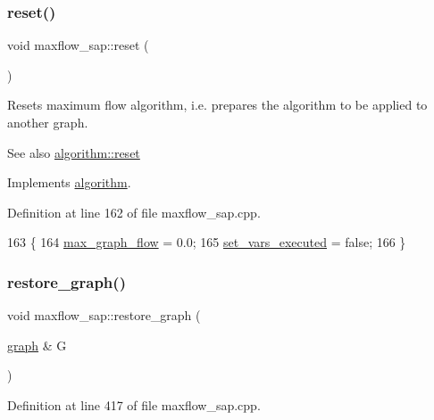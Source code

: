 \subsubsection{\texorpdfstring{reset()}{reset()}}
{\footnotesize\ttfamily void maxflow\+\_\+sap\+::reset (\begin{DoxyParamCaption}{ }\end{DoxyParamCaption})\hspace{0.3cm}{\ttfamily [virtual]}}

Resets maximum flow algorithm, i.\+e. prepares the algorithm to be applied to another graph.

\begin{DoxySeeAlso}{See also}
\mbox{\hyperlink{classalgorithm_a21aba63d066ae7897de6ca7d8425c408}{algorithm\+::reset}} 
\end{DoxySeeAlso}


Implements \mbox{\hyperlink{classalgorithm_a21aba63d066ae7897de6ca7d8425c408}{algorithm}}.



Definition at line 162 of file maxflow\+\_\+sap.\+cpp.


\begin{DoxyCode}
163 \{
164     \mbox{\hyperlink{classmaxflow__sap_a77c650fd11632352a1228f2cbd38caf1}{max\_graph\_flow}} = 0.0;
165     \mbox{\hyperlink{classmaxflow__sap_aad7f764b9e9732b996f402ffadbf5b70}{set\_vars\_executed}} = \textcolor{keyword}{false};
166 \}
\end{DoxyCode}
\mbox{\label{classmaxflow__sap_ad1a311df47e4b9936ead7c306d723ed0}} 
\subsubsection{\texorpdfstring{restore\+\_\+graph()}{restore\_graph()}}
{\footnotesize\ttfamily void maxflow\+\_\+sap\+::restore\+\_\+graph (\begin{DoxyParamCaption}\item[{\mbox{\hyperlink{classgraph}{graph}} \&}]{G }\end{DoxyParamCaption})\hspace{0.3cm}{\ttfamily [protected]}}



Definition at line 417 of file maxflow\+\_\+sap.\+cpp.


